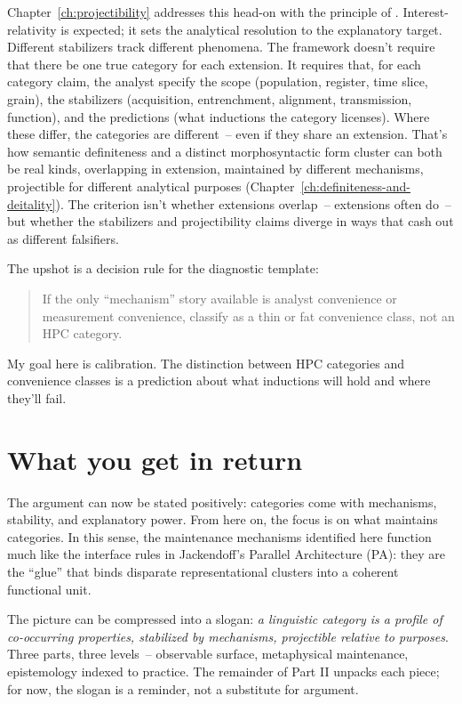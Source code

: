 Chapter~\ref{ch:projectibility} addresses this head-on with the principle of . Interest-relativity is expected; it sets the analytical resolution to the explanatory target. Different stabilizers track different phenomena. The framework doesn't require that there be one true category for each extension. It requires that, for each category claim, the analyst specify the scope (population, register, time slice, grain), the stabilizers (acquisition, entrenchment, alignment, transmission, function), and the predictions (what inductions the category licenses). Where these differ, the categories are different~-- even if they share an extension. That's how semantic definiteness and a distinct morphosyntactic form cluster can both be real kinds, overlapping in extension, maintained by different mechanisms, projectible for different analytical purposes (Chapter~\ref{ch:definiteness-and-deitality}). The criterion isn't whether extensions overlap~-- extensions often do~-- but whether the stabilizers and projectibility claims diverge in ways that cash out as different falsifiers.

The upshot is a decision rule for the diagnostic template:

\begin{quote}
If the only \enquote{mechanism} story available is analyst convenience or measurement convenience, classify as a thin or fat convenience class, not an HPC category.
\end{quote}

\noindent My goal here is calibration. The distinction between HPC categories and convenience classes is a prediction about what inductions will hold and where they'll fail.

\section{What you get in return}
\label{sec:4:payoffs}

The argument can now be stated positively: categories come with mechanisms, stability, and explanatory power. From here on, the focus is on what maintains categories. In this sense, the maintenance mechanisms identified here function much like the interface rules in Jackendoff's Parallel Architecture (PA): they are the \enquote{glue} that binds disparate representational clusters into a coherent functional unit.

The picture can be compressed into a slogan: \emph{a linguistic category is a profile of co-occurring properties, stabilized by mechanisms, projectible relative to purposes}. Three parts, three levels~-- observable surface, metaphysical maintenance, epistemology indexed to practice. The remainder of Part II unpacks each piece; for now, the slogan is a reminder, not a substitute for argument.

